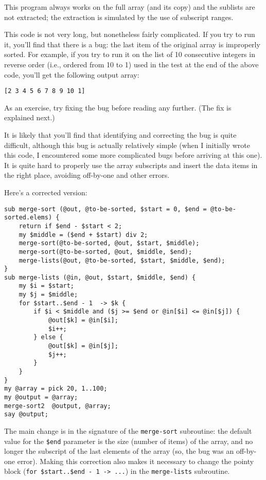 This program always works on the full array (and its copy) and 
the sublists are not extracted; the extraction is simulated by 
the use of subscript ranges.

This code is not very long, but nonetheless fairly complicated.
If you try to run it, you'll find that there is a bug: 
the last item of the original array is improperly sorted. For 
example, if you try to run it on the list of 10 consecutive 
integers in reverse order (i.e., ordered from 10 to 1) used in 
the test at the end of the above code, you'll get the following 
output array:

\begin{verbatim}
[2 3 4 5 6 7 8 9 10 1]
\end{verbatim}


As an exercise, try fixing the bug before reading any further. 
(The fix is explained next.)

It is likely that you'll find that identifying and correcting 
the bug is quite difficult, although this bug is actually 
relatively simple (when I initially wrote this code, I 
encountered some more complicated bugs before arriving at this one). 
It is quite hard to properly use the array subscripts and 
insert the data items in the right place, avoiding off-by-one 
and other errors.

Here's a corrected version:

\begin{verbatim}
sub merge-sort (@out, @to-be-sorted, $start = 0, $end = @to-be-sorted.elems) {
    return if $end - $start < 2;
    my $middle = ($end + $start) div 2;
    merge-sort(@to-be-sorted, @out, $start, $middle);
    merge-sort(@to-be-sorted, @out, $middle, $end);
    merge-lists(@out, @to-be-sorted, $start, $middle, $end);
}
sub merge-lists (@in, @out, $start, $middle, $end) {
    my $i = $start;
    my $j = $middle;
    for $start..$end - 1  -> $k {
        if $i < $middle and ($j >= $end or @in[$i] <= @in[$j]) {
            @out[$k] = @in[$i];
            $i++;
        } else {
            @out[$k] = @in[$j];
            $j++;
        } 
    }
}
my @array = pick 20, 1..100;
my @output = @array;
merge-sort2  @output, @array;
say @output;
\end{verbatim}

The main change is in the signature of the \verb'merge-sort' 
subroutine: the default value for the \verb'$end' parameter 
is the size (number of items) of the array, and no 
longer the subscript of the last elements of the array (so, 
the bug was an off-by-one error). Making this correction 
also makes it necessary to change the pointy block 
(\verb'for $start..$end - 1 -> ...') in the 
\verb'merge-lists' subroutine.

